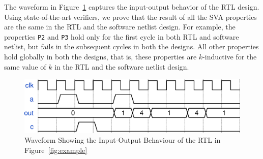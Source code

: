 The waveform in Figure~\ref{intro-waveform} captures the input-output behavior of the RTL design. 
Using state-of-the-art verifiers, we prove that the result of all the SVA properties 
are the same in the RTL and the software netlist design. 
For example, the properties \texttt{P2} and \texttt{P3} 
hold only for the first cycle in both RTL and software netlist, but fails in the 
subsequent cycles in both the designs.  All other properties 
hold globally in both the designs, that is, these properties are $k$-inductive 
for the same value of $k$ in the RTL and the software netlist design.
%
\begin{figure} 
\begin{center}
  \includegraphics[width=\columnwidth]{figures/example/waveform1.eps}%
	\caption{Waveform Showing the Input-Output Behaviour of the RTL in Figure~\ref{fig:example}}
\label{intro-waveform}
\end{center}
\end{figure}
%
